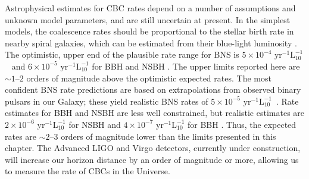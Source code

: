 Astrophysical estimates for \ac{CBC} rates depend on a number of assumptions
and unknown model parameters, and are still uncertain at present.  In the
simplest models, the coalescence rates should be proportional to the stellar
birth rate in nearby spiral galaxies, which can be estimated from their
blue-light luminosity \cite{LIGOS3S4Galaxies}.  The optimistic, upper end of
the plausible rate range for \ac{BNS} is $5 \times 10^{-4} \textrm{ yr}^{-1}
\mathrm{L}_{10}^{-1}$~\cite{Kalogera:2004tn, Kalogera:2004nt} and $6 \times
10^{-5} \textrm{ yr}^{-1} \mathrm{L}_{10}^{-1}$ for \ac{BBH} and \ac{NSBH}
\cite{Oshaughnessy:2008, OShaughnessy:2005}.  The upper limits reported here
are $\sim 1$--$2$ orders of magnitude above the optimistic expected rates.  The
most confident \ac{BNS} rate predictions are based on extrapolations from
observed binary pulsars in our Galaxy; these yield realistic \ac{BNS} rates of
$5 \times 10^{-5} \textrm{ yr}^{-1}
\mathrm{L}_{10}^{-1}$~\cite{Kalogera:2004tn, Kalogera:2004nt}.  Rate estimates
for \ac{BBH} and \ac{NSBH} are less well constrained, but realistic estimates
are $2 \times 10^{-6} \textrm{ yr}^{-1} \mathrm{L}_{10}^{-1}$ for \ac{NSBH}
\cite{Oshaughnessy:2008} and $4 \times 10^{-7} \textrm{ yr}^{-1}
\mathrm{L}_{10}^{-1}$ for \ac{BBH} \cite{OShaughnessy:2005}.  Thus, the
expected rates are $\sim 2$--$3$ orders of magnitude lower than the limits
presented in this chapter. The Advanced LIGO and Virgo detectors, currently
under construction, will increase our horizon distance by an order of magnitude
or more, allowing us to measure the rate of CBCs in the Universe.
